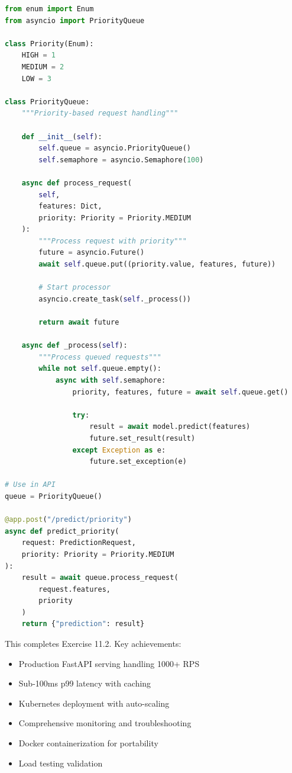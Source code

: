 \begin{lstlisting}[language=Python]
from enum import Enum
from asyncio import PriorityQueue

class Priority(Enum):
    HIGH = 1
    MEDIUM = 2
    LOW = 3

class PriorityQueue:
    """Priority-based request handling"""

    def __init__(self):
        self.queue = asyncio.PriorityQueue()
        self.semaphore = asyncio.Semaphore(100)

    async def process_request(
        self,
        features: Dict,
        priority: Priority = Priority.MEDIUM
    ):
        """Process request with priority"""
        future = asyncio.Future()
        await self.queue.put((priority.value, features, future))

        # Start processor
        asyncio.create_task(self._process())

        return await future

    async def _process(self):
        """Process queued requests"""
        while not self.queue.empty():
            async with self.semaphore:
                priority, features, future = await self.queue.get()

                try:
                    result = await model.predict(features)
                    future.set_result(result)
                except Exception as e:
                    future.set_exception(e)

# Use in API
queue = PriorityQueue()

@app.post("/predict/priority")
async def predict_priority(
    request: PredictionRequest,
    priority: Priority = Priority.MEDIUM
):
    result = await queue.process_request(
        request.features,
        priority
    )
    return {"prediction": result}
\end{lstlisting}

This completes Exercise 11.2. Key achievements:
\begin{itemize}
    \item Production FastAPI serving handling 1000+ RPS
    \item Sub-100ms p99 latency with caching
    \item Kubernetes deployment with auto-scaling
    \item Comprehensive monitoring and troubleshooting
    \item Docker containerization for portability
    \item Load testing validation
\end{itemize}

